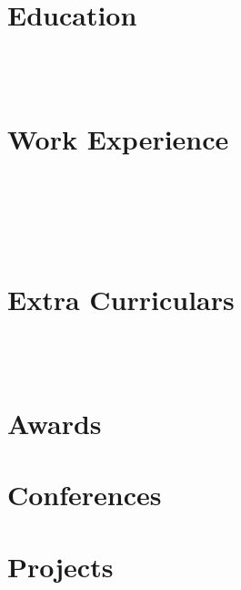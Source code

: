 \documentclass[a4paper,11pt]{article}
\begin{document}
\pagestyle{empty}

 \\[2pt]



\section{Education}
 \\[5pt]
 \\[-18pt]


\section{Work Experience}
 \\[5pt]
 \\[5pt]
 \\[5pt]
 \\[-14pt]

\section{Extra Curriculars}
 \\[5pt]
 \\[-15pt]

\section{Awards}


\newpage

\section{Conferences}


\section{Projects}
 \\[5pt]
 \\[5pt]
 \\[5pt]
 \\[5pt]
 
\end{document}
